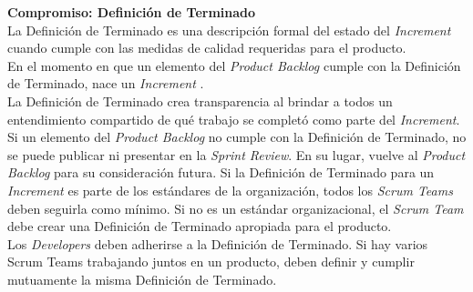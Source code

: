 \begin{spacing}{1.5}
			\textbf{Compromiso: Definición de Terminado}\\
			La Definición de Terminado es una descripción formal del estado del \textit{Increment} cuando cumple con las medidas de calidad requeridas para el producto.\\			
			En el momento en que un elemento del \textit{Product Backlog} cumple con la Definición de Terminado, nace un \textit{Increment} \cite{chap2_scrum}.\\
			La Definición de Terminado crea transparencia al brindar a todos un entendimiento compartido de qué
			trabajo se completó como parte del \textit{Increment}. Si un elemento del \textit{Product Backlog} no cumple con la Definición de Terminado, no se puede publicar ni presentar en la \textit{Sprint Review}. En su lugar, vuelve al \textit{Product Backlog} para su consideración futura.
			Si la Definición de Terminado para un \textit{Increment} es parte de los estándares de la organización, todos los \textit{Scrum Teams} deben seguirla como mínimo. Si no es un estándar organizacional, el \textit{Scrum Team} debe crear una Definición de Terminado apropiada para el producto.\\
			Los \textit{Developers} deben adherirse a la Definición de Terminado. Si hay varios Scrum Teams trabajando juntos en un producto, deben definir y cumplir mutuamente la misma Definición de Terminado.
			

\end{spacing}
